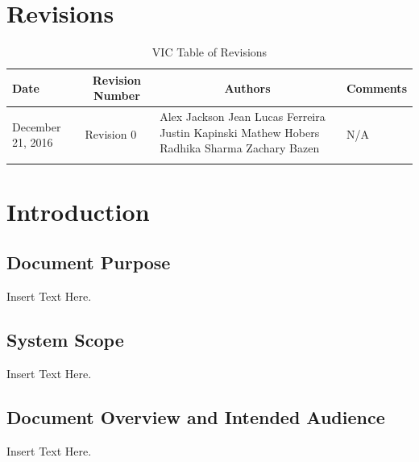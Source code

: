 \documentclass [10pt]{article}
\begin{document}
\section{Revisions}
\begin{longtable}{| p{ } | p{ } | p{ } | p{ } |}

\hline 
\centering \textbf{Date} & 
\multicolumn{1}{c}{\textbf {Revision Number}} &
\multicolumn{1}{|c}{\textbf {Authors}} & 
\multicolumn{1}{|c|}{\textbf {Comments}} \\ \hline

\multirow{4}{*}{\centering December 21, 2016}  & 
\multirow{4}{*}{Revision 0}& 
{Alex Jackson \newline
Jean Lucas Ferreira \newline
Justin Kapinski\newline
Mathew Hobers\newline
Radhika Sharma\newline
Zachary Bazen}
&
 \multirow{4}{*}{N/A} \\ 
\hline 

\caption{VIC Table of Revisions} 
\end{longtable}
\pagebreak


\section {Introduction}

\subsection{Document Purpose}
Insert Text Here.

\subsection{System Scope}
Insert Text Here. 

\subsection{Document Overview and Intended Audience}
Insert Text Here. 
\end{document}
